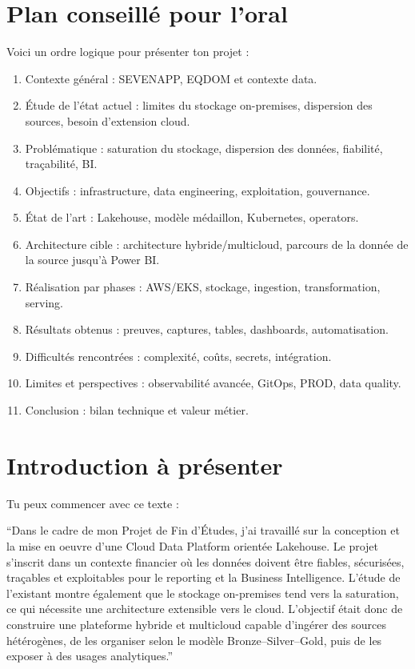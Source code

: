 \documentclass[11pt,a4paper]{article}
\newcommand{\important}[1]{%
  \vspace{0.25cm}
  \noindent
  \colorbox{softblue}{%
    \parbox{\dimexpr\textwidth-2\fboxsep\relax}{#1}%
  }
  \vspace{0.2cm}
}
\begin{document}
\section{Plan conseillé pour l'oral}

Voici un ordre logique pour présenter ton projet :
\begin{enumerate}
  \item Contexte général : SEVENAPP, EQDOM et contexte data.
  \item Étude de l'état actuel : limites du stockage on-premises, dispersion des sources, besoin d'extension cloud.
  \item Problématique : saturation du stockage, dispersion des données, fiabilité, traçabilité, BI.
  \item Objectifs : infrastructure, data engineering, exploitation, gouvernance.
  \item État de l'art : Lakehouse, modèle médaillon, Kubernetes, operators.
  \item Architecture cible : architecture hybride/multicloud, parcours de la donnée de la source jusqu'à Power BI.
  \item Réalisation par phases : AWS/EKS, stockage, ingestion, transformation, serving.
  \item Résultats obtenus : preuves, captures, tables, dashboards, automatisation.
  \item Difficultés rencontrées : complexité, coûts, secrets, intégration.
  \item Limites et perspectives : observabilité avancée, GitOps, PROD, data quality.
  \item Conclusion : bilan technique et valeur métier.
\end{enumerate}

\section{Introduction à présenter}

Tu peux commencer avec ce texte :

\important{
``Dans le cadre de mon Projet de Fin d'Études, j'ai travaillé sur la conception et la mise en oeuvre d'une Cloud Data Platform orientée Lakehouse. Le projet s'inscrit dans un contexte financier où les données doivent être fiables, sécurisées, traçables et exploitables pour le reporting et la Business Intelligence. L'étude de l'existant montre également que le stockage on-premises tend vers la saturation, ce qui nécessite une architecture extensible vers le cloud. L'objectif était donc de construire une plateforme hybride et multicloud capable d'ingérer des sources hétérogènes, de les organiser selon le modèle Bronze--Silver--Gold, puis de les exposer à des usages analytiques.''
}
\end{document}

